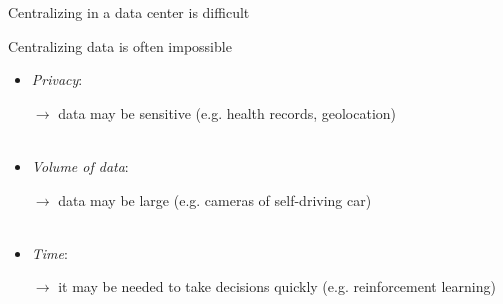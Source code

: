 \documentclass[aspectratio=169,14pt]{beamer}
\begin{document}
\begin{frame}[t]{Centralizing in a data center is difficult}

  Centralizing data is often impossible
  \begin{itemize}
  \item \emph{Privacy}:

    {\small
    $\rightarrow$ data may be sensitive (e.g. health records, geolocation)
    }
    \\
    ~

  \item \emph{Volume of data}:

    {\small
      $\rightarrow$ data may be large (e.g. cameras of self-driving car)
    }
    \\
    ~
    
  \item \emph{Time}:

    {\small
    $\rightarrow$ it may be needed to take decisions quickly (e.g. reinforcement learning)
    }
    
  \end{itemize}

\end{frame}



    
    

    
        
  
\end{document}
